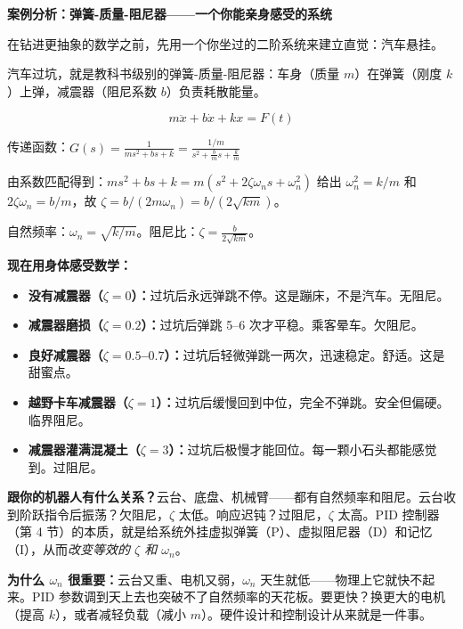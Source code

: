 \vspace{0.5em}
\begin{mdframed}[linewidth=1pt, innertopmargin=10pt, innerbottommargin=10pt]
\textbf{案例分析：弹簧-质量-阻尼器——一个你能亲身感受的系统}

\vspace{0.3em}
在钻进更抽象的数学之前，先用一个你坐过的二阶系统来建立直觉：汽车悬挂。

汽车过坑，就是教科书级别的弹簧-质量-阻尼器：车身（质量 $m$）在弹簧（刚度 $k$）上弹，减震器（阻尼系数 $b$）负责耗散能量。

\[
m\ddot{x} + b\dot{x} + kx = F(t)
\]

传递函数：$G(s) = \frac{1}{ms^2 + bs + k} = \frac{1/m}{s^2 + \frac{b}{m}s + \frac{k}{m}}$

由系数匹配得到：$ms^2 + bs + k = m(s^2 + 2\zeta\omega_n s + \omega_n^2)$ 给出 $\omega_n^2 = k/m$ 和 $2\zeta\omega_n = b/m$，故 $\zeta = b/(2m\omega_n) = b/(2\sqrt{km})$。

自然频率：$\omega_n = \sqrt{k/m}$。\quad 阻尼比：$\zeta = \frac{b}{2\sqrt{km}}$。

\textbf{现在用身体感受数学：}
\begin{itemize}[nosep]
    \item \textbf{没有减震器（$\zeta = 0$）：}过坑后永远弹跳不停。这是蹦床，不是汽车。无阻尼。
    \item \textbf{减震器磨损（$\zeta = 0.2$）：}过坑后弹跳 5--6 次才平稳。乘客晕车。欠阻尼。
    \item \textbf{良好减震器（$\zeta = 0.5$--$0.7$）：}过坑后轻微弹跳一两次，迅速稳定。舒适。这是甜蜜点。
    \item \textbf{越野卡车减震器（$\zeta = 1$）：}过坑后缓慢回到中位，完全不弹跳。安全但偏硬。临界阻尼。
    \item \textbf{减震器灌满混凝土（$\zeta = 3$）：}过坑后极慢才能回位。每一颗小石头都能感觉到。过阻尼。
\end{itemize}

\textbf{跟你的机器人有什么关系？}云台、底盘、机械臂——都有自然频率和阻尼。云台收到阶跃指令后振荡？欠阻尼，$\zeta$ 太低。响应迟钝？过阻尼，$\zeta$ 太高。PID 控制器（第 4 节）的本质，就是给系统外挂虚拟弹簧（P）、虚拟阻尼器（D）和记忆（I），从而\textit{改变等效的 $\zeta$ 和 $\omega_n$}。

\textbf{为什么 $\omega_n$ 很重要：}云台又重、电机又弱，$\omega_n$ 天生就低——物理上它就快不起来。PID 参数调到天上去也突破不了自然频率的天花板。要更快？换更大的电机（提高 $k$），或者减轻负载（减小 $m$）。硬件设计和控制设计从来就是一件事。
\end{mdframed}

